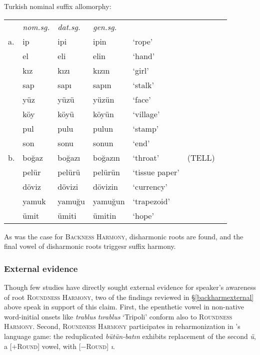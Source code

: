 \begin{example}
Turkish nominal suffix allomorphy: 

\begin{tabular}{l l l l l l l}
   & \emph{nom.sg.} & \emph{dat.sg.} & \emph{gen.sg.}  \\
a. & ip             & ipi            & ipin           & `rope' & \citep[][216]{Clements1982} \\
   & el             & eli            & elin           & `hand'    \\
   & kız            & kızı           & kızın          & `girl'    \\
   & sap            & sapı           & sapın          & `stalk'   \\
   & yüz            & yüzü           & yüzün          & `face'    \\
   & köy            & köyü           & köyün          & `village' \\
   & pul            & pulu           & pulun          & `stamp'   \\
   & son            & sonu           & sonun          & `end'     \\
b. & boğaz          & boğazı         & boğazın        & `throat'  & (TELL) \\
   & pelür          & pelürü         & pelürün        & `tissue paper' \\
   & döviz          & dövizi         & dövizin        & `currency' \\
   & yamuk          & yamuğu         & yamuğun        & `trapezoid' \\
   & ümit           & ümiti          & ümitin         & `hope'     \\
\end{tabular}
\end{example}

\noindent As was the case for \textsc{Backness Harmony}, disharmonic roots are found, and the final vowel of disharmonic roots triggesr suffix harmony.

\subsubsection{External evidence}

Though few studies have directly sought external evidence for speaker's awareness of root \textsc{Roundness Harmony}, two of the findings reviewed in \S\ref{backharmexternal} above speak in support of this claim. First, the epenthetic vowel in non-native word-initial onsets
like \emph{trablus} \alt{} \emph{tırablus} `Tripoli' conform also to \textsc{Roundness Harmony}.
Second, \textsc{Roundness Harmony} participates in reharmonization in \citeauthor{Harrison2001}'s language game: the reduplicated \emph{bütün-batın} exhibits replacement of the second \emph{ü}, a [$+$\textsc{Round}] vowel, with [$-$\textsc{Round}] \emph{ı}.
